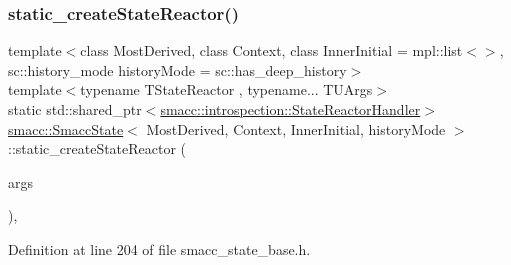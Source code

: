 \subsubsection{\texorpdfstring{static\+\_\+create\+State\+Reactor()}{static\_createStateReactor()}}
{\footnotesize\ttfamily template$<$class Most\+Derived, class Context, class Inner\+Initial = mpl\+::list$<$$>$, sc\+::history\+\_\+mode history\+Mode = sc\+::has\+\_\+deep\+\_\+history$>$ \\
template$<$typename T\+State\+Reactor , typename... T\+U\+Args$>$ \\
static std\+::shared\+\_\+ptr$<$\hyperlink{classsmacc_1_1introspection_1_1StateReactorHandler}{smacc\+::introspection\+::\+State\+Reactor\+Handler}$>$ \hyperlink{classsmacc_1_1SmaccState}{smacc\+::\+Smacc\+State}$<$ Most\+Derived, Context, Inner\+Initial, history\+Mode $>$\+::static\+\_\+create\+State\+Reactor (\begin{DoxyParamCaption}\item[{T\+U\+Args...}]{args }\end{DoxyParamCaption})\hspace{0.3cm}{\ttfamily [inline]}, {\ttfamily [static]}}



Definition at line 204 of file smacc\+\_\+state\+\_\+base.\+h.


